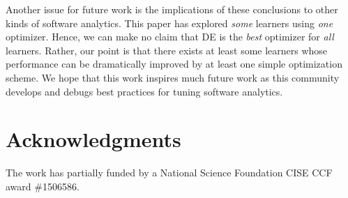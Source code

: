 \documentclass{sig-alternative}
\begin{document}
Another issue for future work is the implications of these
conclusions to other kinds of software analytics.
 This paper has explored  {\em some} learners using {\em one}  optimizer. Hence, we can make
no claim that DE is the {\em best} optimizer for {\em all} learners.
Rather, our point is that there exists at least some learners
whose performance can be dramatically improved by 
at least one simple optimization scheme.  We hope that this work inspires
much future work as this community develops and debugs best practices for tuning
software analytics.
 
 

\section*{Acknowledgments}
The work has partially funded by a National Science Foundation CISE CCF award \#1506586.
 
\vspace*{0.5mm}
 
 


\balance
  

   



  


  
\end{document}
